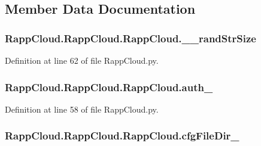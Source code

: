 \subsection{Member Data Documentation}
\hypertarget{classRappCloud_1_1RappCloud_1_1RappCloud_a65a3a87c5465d4f5c428dc0fc85c2078}{
\subsubsection[{\-\_\-\-\_\-rand\-Str\-Size}]{\setlength{\rightskip}{0pt plus 5cm}Rapp\-Cloud.\-Rapp\-Cloud.\-Rapp\-Cloud.\-\_\-\-\_\-rand\-Str\-Size\hspace{0.3cm}{\ttfamily [private]}}}\label{classRappCloud_1_1RappCloud_1_1RappCloud_a65a3a87c5465d4f5c428dc0fc85c2078}


Definition at line 62 of file Rapp\-Cloud.\-py.

\hypertarget{classRappCloud_1_1RappCloud_1_1RappCloud_a25b6e93981b99843ada1073abc2725d6}{
\subsubsection[{auth\-\_\-}]{\setlength{\rightskip}{0pt plus 5cm}Rapp\-Cloud.\-Rapp\-Cloud.\-Rapp\-Cloud.\-auth\-\_\-}}\label{classRappCloud_1_1RappCloud_1_1RappCloud_a25b6e93981b99843ada1073abc2725d6}


Definition at line 58 of file Rapp\-Cloud.\-py.

\hypertarget{classRappCloud_1_1RappCloud_1_1RappCloud_a72701504206c4cf9ba7648061c024bf6}{
\subsubsection[{cfg\-File\-Dir\-\_\-}]{\setlength{\rightskip}{0pt plus 5cm}Rapp\-Cloud.\-Rapp\-Cloud.\-Rapp\-Cloud.\-cfg\-File\-Dir\-\_\-}}\label{classRappCloud_1_1RappCloud_1_1RappCloud_a72701504206c4cf9ba7648061c024bf6}


